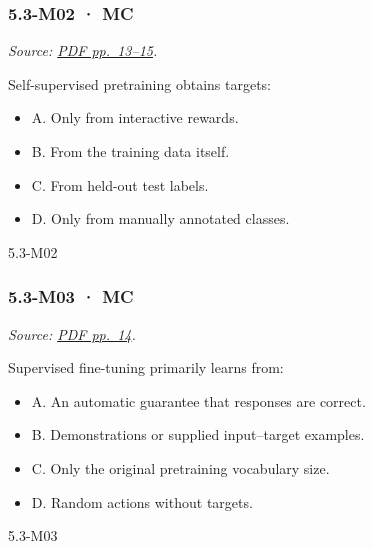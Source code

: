 \noindent\begin{minipage}{\linewidth}

\subsubsection{5.3-M02 · MC}\label{m02-mc-14}

\emph{Source:
\href{../Lecture\%20Slides/5.3.\%20Foundation\%20models.pdf\#page=13}{PDF
pp.~13--15}.}

Self-supervised pretraining obtains targets:

\begin{itemize}
\tightlist
\item
  A. Only from interactive rewards.
\item
  B. From the training data itself.
\item
  C. From held-out test labels.
\item
  D. Only from manually annotated classes.
\end{itemize}

\begin{solution}[8mm]{5.3-M02}

\end{solution}
\end{minipage}\par\medskip

\noindent\begin{minipage}{\linewidth}

\subsubsection{5.3-M03 · MC}\label{m03-mc-14}

\emph{Source:
\href{../Lecture\%20Slides/5.3.\%20Foundation\%20models.pdf\#page=14}{PDF
pp.~14}.}

Supervised fine-tuning primarily learns from:

\begin{itemize}
\tightlist
\item
  A. An automatic guarantee that responses are correct.
\item
  B. Demonstrations or supplied input--target examples.
\item
  C. Only the original pretraining vocabulary size.
\item
  D. Random actions without targets.
\end{itemize}

\begin{solution}[8mm]{5.3-M03}

\end{solution}
\end{minipage}\par\medskip

